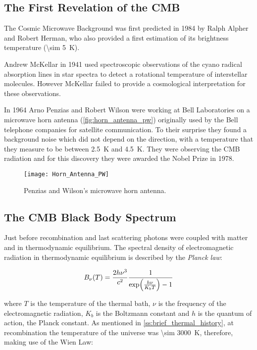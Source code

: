 \subsection{The First Revelation of the CMB}

The Cosmic Microwave Background was first predicted in 1984 by Ralph Alpher
and Robert Herman, who also provided a first estimation of its brightness
temperature (\SI{\sim 5}{\kelvin}).

Andrew McKellar in 1941 used spectroscopic observations of the cyano radical
absorption lines in star spectra to detect a rotational temperature of
interstellar molecules. However McKellar failed to provide a cosmological
interpretation for these observations.

In 1964 Arno Penzias and Robert Wilson were working at Bell Laboratories
on a microwave horn antenna (\autoref{fig:horn_antenna_pw}) originally used by
the Bell telephone companies for satellite communication.
To their surprise they found a background noise which did not depend on the
direction, with a temperature that they measure to be between
\SI{2.5}{\kelvin} and \SI{4.5}{\kelvin}. They were observing the CMB
radiation and for this discovery they were awarded the Nobel Prize in 1978.

\begin{figure}
        \centering
        \texttt{[image: Horn\_Antenna\_PW]}
        \caption{Penzias and Wilson's microwave horn antenna.}
        \label{fig:horn_antenna_pw}
\end{figure}

\subsection{The CMB Black Body Spectrum}\label{ss:cmb_bb}

Just before recombination and last scattering photons were
coupled with matter and in thermodynamic equilibrium. The spectral density
of electromagnetic radiation in thermodynamic equilibrium is described by
the \emph{Planck law}:

\begin{equation}
        B_\nu\qty(T) = \frac{2h\nu^3}{c^2}
        \frac{1}{\exp(\frac{h\nu}{K_b T}) - 1}
\end{equation}

where $T$ is the temperature of the thermal bath, $\nu$ is the frequency of
the electromagnetic radiation, $K_b$ is the Boltzmann constant and $h$ is
the quantum of action, the Planck constant. As mentioned in
\autoref{ss:brief_thermal_history}, at recombination the temperature of the
universe was \SI{\sim 3000}{\kelvin}, therefore, making use of the Wien
Law:


